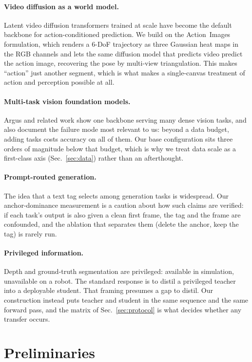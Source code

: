 \documentclass{article}
\begin{document}
\paragraph{Video diffusion as a world model.} Latent video diffusion transformers trained at
scale have become the default backbone for action-conditioned prediction. We build on the
Action~Images formulation, which renders a 6-DoF trajectory as three Gaussian heat maps in the
RGB channels and lets the same diffusion model that predicts video predict the action image,
recovering the pose by multi-view triangulation. This makes ``action'' just another segment,
which is what makes a single-canvas treatment of action and perception possible at all.

\paragraph{Multi-task vision foundation models.} Argus and related work show one backbone serving
many dense vision tasks, and also document the failure mode most relevant to us: beyond a data
budget, adding tasks costs accuracy on all of them. Our base configuration sits three orders of
magnitude below that budget, which is why we treat data scale as a first-class axis
(Sec.~\ref{sec:data}) rather than an afterthought.

\paragraph{Prompt-routed generation.} The idea that a text tag selects among generation tasks is
widespread. Our anchor-dominance measurement is a caution about how such claims are verified: if
each task's output is also given a clean first frame, the tag and the frame are confounded, and
the ablation that separates them (delete the anchor, keep the tag) is rarely run.

\paragraph{Privileged information.} Depth and ground-truth segmentation are privileged: available
in simulation, unavailable on a robot. The standard response is to distil a privileged teacher
into a deployable student. That framing presumes a gap to distil. Our construction instead puts
teacher and student in the same sequence and the same forward pass, and the matrix of
Sec.~\ref{sec:protocol} is what decides whether any transfer occurs.

\section{Preliminaries}
\label{sec:prelim}
\end{document}
